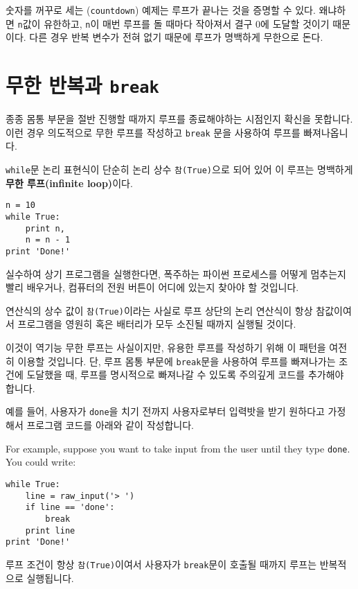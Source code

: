 
숫자를 꺼꾸로 세는 ({\tt countdown}) 예제는 루프가 끝나는 것을 증명할 수 있다.
왜냐하면 {\tt n}값이 유한하고, {\tt n}이 매번 루프를 돌 때마다 작아져서 결구 0에 도달할 것이기 때문이다. 
다른 경우 반복 변수가 전혀 없기 때문에 루프가 명백하게 무한으로 돈다.

\section{무한 반복과 {\tt break}}
종종 몸통 부문을 절반 진행할 때까지 루프를 종료해야하는 시점인지 확신을 못합니다.
이런 경우 의도적으로 무한 루프를 작성하고 {\tt break} 문을 사용하여 루프를 빠져나옵니다.

{\tt while}문 논리 표현식이 단순히 논리 상수 {\tt 참(True)}으로 되어 있어 이 루프는 명백하게 {\bf 무한 루프(infinite loop)}이다.

\beforeverb
\begin{verbatim}
n = 10
while True:
    print n, 
    n = n - 1
print 'Done!'
\end{verbatim}
\afterverb
%

실수하여 상기 프로그램을 실행한다면, 폭주하는 파이썬 프로세스를 어떻게 멈추는지 빨리 배우거나, 컴퓨터의 전원 버튼이 어디에 있는지 찾아야 할 것입니다.

연산식의 상수 값이 {\tt 참(True)}이라는 사실로 루프 상단의 논리 연산식이 항상 참값이여서 프로그램을 영원히 혹은 배터리가 모두 소진될 때까지 실행될 것이다.

이것이 역기능 무한 루프는 사실이지만, 유용한 루프를 작성하기 위해 이 패턴을 여전히 이용할 것입니다. 단, 루프 몸통 부문에 {\tt break}문을 사용하여 
루프를 빠져나가는 조건에 도달했을 때, 루프를 명시적으로 빠져나갈 수 있도록 주의깊게 코드를 추가해야 합니다.

예를 들어, 사용자가 {\tt done}을 치기 전까지 사용자로부터 입력밧을 받기 원하다고 가정해서 프로그램 코드를 아래와 같이 작성합니다.

For example, suppose you want to take input from the user until they
type {\tt done}.  You could write:

\beforeverb
\begin{verbatim}
while True:
    line = raw_input('> ')
    if line == 'done':
        break
    print line
print 'Done!'
\end{verbatim}
\afterverb
%
루프 조건이 항상 {\tt 참(True)}이여서 사용자가 {\tt break}문이 호출될 때까지 루프는 반복적으로 실행됩니다.


